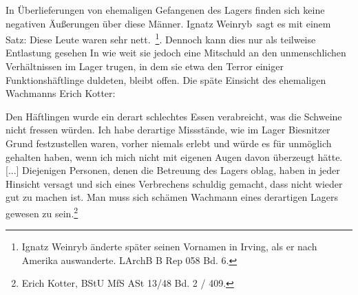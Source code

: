 In Überlieferungen von ehemaligen Gefangenen des Lagers finden sich keine negativen Äußerungen über diese Männer. Ignatz Weinryb~sagt es mit einem Satz: \glqq Diese Leute waren sehr nett.\grqq~\footnote{Ignatz Weinryb änderte später seinen Vornamen in Irving, als er nach Amerika auswanderte. LArchB B Rep 058 Bd. 6.}. Dennoch kann dies nur als teilweise Entlastung gesehen
In wie weit sie jedoch eine Mitschuld an den unmenschlichen Verhältnissen im Lager trugen, in dem sie etwa den Terror einiger Funktionshäftlinge duldeten, bleibt offen.
\newpage
Die späte Einsicht des ehemaligen Wachmanns Erich Kotter:
\label{kotter}
\begin{leftbar}
Den Häftlingen wurde ein derart schlechtes Essen verabreicht, was die Schweine nicht fressen würden. Ich habe derartige Missstände, wie im Lager Biesnitzer Grund festzustellen waren, vorher niemals erlebt und würde es für unmöglich gehalten haben, wenn ich mich nicht mit eigenen Augen davon überzeugt hätte. [...] Diejenigen Personen, denen die Betreuung des Lagers oblag, haben in jeder Hinsicht versagt und sich eines Verbrechens schuldig gemacht, dass nicht wieder gut zu machen ist. Man muss sich schämen Wachmann eines derartigen Lagers gewesen zu sein.\footnote{Erich Kotter, BStU MfS ASt 13/48 Bd. 2 / 409.}
\end{leftbar}

